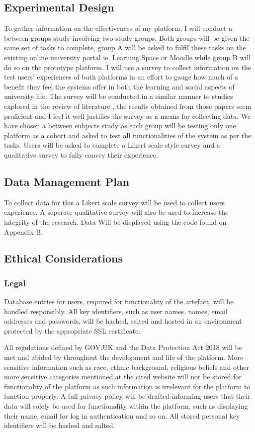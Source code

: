 \documentclass[lettersize,journal]{IEEEtran}
\begin{document}
    	\subsection{Experimental Design}
    	To gather information on the effectiveness of my platform, I will conduct a between groups study involving
    	two study groups. Both groups will be given the same set of tasks to complete, group A will be asked to fulfil
    	these tasks on the existing online university portal ie. Learning Space or Moodle while group B will
        do so on the prototype platform. I will use a survey to collect information on the test users' experiences
    	of both platforms in an effort to gauge how much of a benefit they feel the systems offer in both the
    	learning and social aspects of university life. The survey will be conducted in a similar manner to
	studies explored in the review of literature \cite{Liu2010}\cite{Baruah2012}\cite{Wang2011}\cite{Evans2014}\cite{Akram et al 2017},
	the results obtained from those papers seem proficient and I feel it well justifies the survey as a means for collecting data.
	We have chosen a between subjects study	as each group will be testing only one platform as a cohort and asked to test all functionalities of
    	the system as per the tasks. Users will be asked to complete a Likert scale style survey and a qualitative survey to 
	fully convey their experience.

	\subsection{Data Management Plan}
	To collect data for this a Likert scale survey will be used to collect users experience.
	A seperate qualitative survey will also be used to increase the integrity of the research.
	Data Will be displayed using the code found on Appendix B.
	\subsection{Ethical Considerations}
	\subsubsection{Legal}
	Database entries for users, required for functionality of the artefact, will be
	handled responsibly. All key identifiers, such as user names, names, email
	addresses and passwords, will be hashed, salted and hosted in an environment
	protected by the appropriate SSL certificate.
	
	All regulations defined by GOV.UK and the Data Protection Act 2018 \cite{Gov UK Data Protection} will be met and abided by throughout
	the development and life of the platform. More sensitive information such as race, ethnic background, religious beliefs and other more
	sensitive categories mentioned at the cited website will not be stored for functionality of the platform as such information
	is irrelevant for the platform to function properly. A full privacy policy will be drafted informing users that their data will solely
	be used for functionality within the platform, such as displaying their name, email for log in authentication and so on. All stored
	personal key identifiers will be hashed	and salted.
\end{document}

